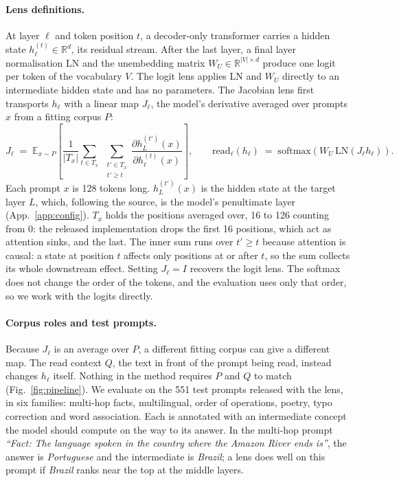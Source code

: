 \documentclass{article}
\begin{document}
\paragraph{Lens definitions.} At layer $\ell$ and token position $t$, a decoder-only transformer
carries a hidden state $h^{(t)}_\ell\in\mathbb{R}^d$, its residual stream. After the last layer, a
final layer normalisation $\mathrm{LN}$ and the unembedding matrix $W_U\in\mathbb{R}^{|V|\times d}$
produce one logit per token of the vocabulary $V$. The logit lens applies $\mathrm{LN}$ and $W_U$
directly to an intermediate hidden state and has no parameters. The Jacobian lens first transports
$h_\ell$ with a linear map $J_\ell$, the model's derivative averaged over prompts $x$ from a fitting
corpus $P$:
\begin{equation}
J_\ell \;=\; \mathbb{E}_{x\sim P}\!\left[\frac{1}{|T_x|}\sum_{t\in T_x}\;\sum_{\substack{t'\in T_x\\ t'\ge t}}
\frac{\partial h^{(t')}_{L}(x)}{\partial h^{(t)}_{\ell}(x)}\right],
\qquad
\mathrm{read}_\ell(h_\ell) \;=\; \mathrm{softmax}\!\left(W_U\,\mathrm{LN}\!\left(J_\ell h_\ell\right)\right).
\label{eq:J}
\end{equation}
Each prompt $x$ is 128 tokens long. $h^{(t')}_L(x)$ is the hidden state at the target layer $L$,
which, following the source, is the model's penultimate layer (App.~\ref{app:config}). $T_x$ holds
the positions averaged over, 16 to 126 counting from 0: the released implementation drops the first
16 positions, which act as attention sinks, and the last. The inner sum runs over $t'\ge t$ because
attention is causal: a state at position $t$ affects only positions at or after $t$, so the sum
collects its whole downstream effect. Setting $J_\ell=I$ recovers the logit lens. The softmax does
not change the order of the tokens, and the evaluation uses only that order, so we work with the
logits directly.

\paragraph{Corpus roles and test prompts.} Because $J_\ell$ is an average over $P$, a different
fitting corpus can give a different map. The read context $Q$, the text in front of the prompt being
read, instead changes $h_\ell$ itself. Nothing in the method requires $P$ and $Q$ to match
(Fig.~\ref{fig:pipeline}). We evaluate on the 551 test prompts released with the lens, in six
families: multi-hop facts, multilingual, order of operations, poetry, typo correction and word
association. Each is annotated with an intermediate concept the model should compute on the way to
its answer. In the multi-hop prompt \emph{``Fact: The language spoken in the country where the Amazon
River ends is''}, the answer is \emph{Portuguese} and the intermediate is \emph{Brazil}; a lens does
well on this prompt if \emph{Brazil} ranks near the top at the middle layers.
\end{document}
